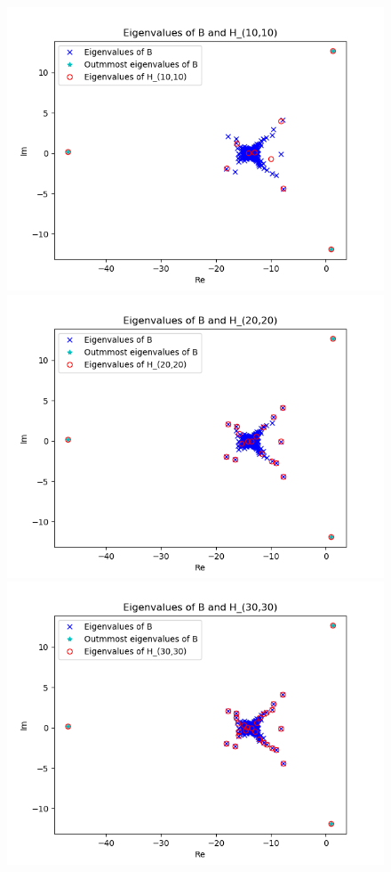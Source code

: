 \begin{figure}[h!]
\includegraphics[scale=0.4]{../task6/task6c_m10.png}
\includegraphics[scale=0.4]{../task6/task6c_m20.png}
\includegraphics[scale=0.4]{../task6/task6c_m30.png}

\end{figure}
